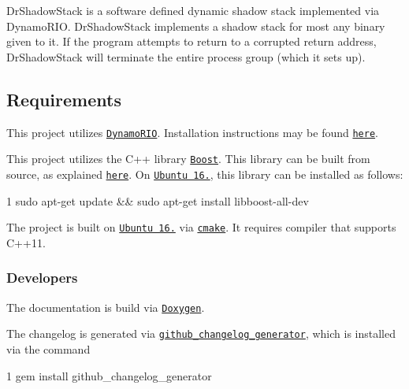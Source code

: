 Dr\+Shadow\+Stack is a software defined dynamic shadow stack implemented via Dynamo\+R\+IO. Dr\+Shadow\+Stack implements a shadow stack for most any binary given to it. If the program attempts to return to a corrupted return address, Dr\+Shadow\+Stack will terminate the entire process group (which it sets up).

\subsection*{Requirements}


\begin{DoxyEnumerate}
\item This project utilizes \href{https://github.com/DynamoRIO/dynamorio}{\tt Dynamo\+R\+IO}. Installation instructions may be found \href{https://github.com/DynamoRIO/dynamorio/wiki/How-To-Build}{\tt here}.
\item This project utilizes the C++ library \href{https://boost.org}{\tt Boost}. This library can be built from source, as explained \href{https://www.boost.org/doc/libs/1_66_0/more/getting_started/unix-variants.html}{\tt here}. On \href{http://releases.ubuntu.com/16.04.4/}{\tt Ubuntu 16.}, this library can be installed as follows\+: 
\begin{DoxyCode}
1 sudo apt-get update && sudo apt-get install libboost-all-dev
\end{DoxyCode}

\item The project is built on \href{http://releases.ubuntu.com/16.04.4/}{\tt Ubuntu 16.} via \href{https://cmake.org/}{\tt cmake}. It requires compiler that supports {\ttfamily C++11}.
\end{DoxyEnumerate}

\subsubsection*{Developers}


\begin{DoxyEnumerate}
\item The documentation is build via \href{http://www.stack.nl/~dimitri/doxygen/}{\tt Doxygen}.
\item The changelog is generated via \href{https://github.com/skywinder/github-changelog-generator}{\tt github\+\_\+changelog\+\_\+generator}, which is installed via the command 
\begin{DoxyCode}
1 gem install github\_changelog\_generator
\end{DoxyCode}

\end{DoxyEnumerate}

